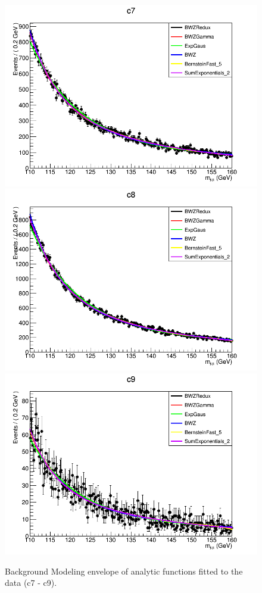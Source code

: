 \begin{figure}[htbp]
  \centering
  \includegraphics[width=0.65\linewidth]{figures/ch_higgs/backgroundmodel/uf_bdt/backgroundFits__c7__bkgModels.png}\\
  \includegraphics[width=0.65\linewidth]{figures/ch_higgs/backgroundmodel/uf_bdt/backgroundFits__c8__bkgModels.png}\\
  \includegraphics[width=0.65\linewidth]{figures/ch_higgs/backgroundmodel/uf_bdt/backgroundFits__c9__bkgModels.png}
  \caption{Background Modeling envelope of analytic functions fitted to the data (c7 - c9).}
  \label{fig:higgs_bmodel_bdtc7c9}
\end{figure}
